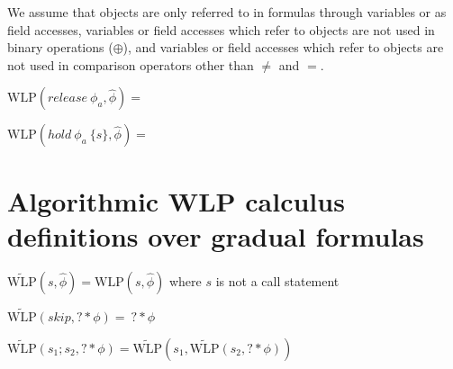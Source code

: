 \documentclass {article}
\newcommand{\lcar}{\left<}
\newcommand{\rcar}{\right>}
\newcommand{\fphi}{\widehat{\phi}}
\newcommand{\wlp}[2]{\text{WLP}(#1,#2)}
\newcommand{\twlp}[2]{\widetilde{\text{WLP}}(#1,#2)}
\begin{document}
We assume that objects are only referred to in formulas through variables or as field accesses, variables or field accesses which refer to objects are not used in binary operations ($\oplus$), and variables or field accesses which refer to objects are not used in comparison operators other than $\neq$ and $=$.

%	
%
%
%
%
%
%

\vspace{0.5cm}

$\wlp{release \ \phi_a}{\fphi} = $

\vspace{0.5cm}

$\wlp{hold \ \phi_a \ \{s\}}{\fphi} = $

\section{Algorithmic WLP calculus definitions over gradual formulas}
\hspace{0.5cm}

$\twlp{s}{\fphi} = \wlp{s}{\fphi} $ where $s$ is not a call statement

\vspace{0.5cm}

$\twlp{skip}{? \ast \phi} = \ ? \ast \phi$

\vspace{0.5cm}

$\twlp{s_1;s_2}{? \ast \phi} = \twlp{s_1}{\twlp{s_2}{? \ast \phi}} $
\end{document}
